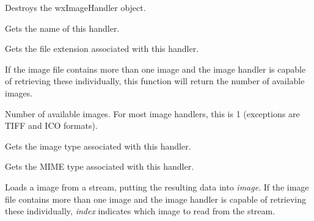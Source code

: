\label{wximagehandlerdtor}


Destroys the wxImageHandler object.


\label{wximagehandlergetname}


Gets the name of this handler.


\label{wximagehandlergetextension}


Gets the file extension associated with this handler.


\label{wximagehandlergetimagecount}


If the image file contains more than one image and the image handler is capable 
of retrieving these individually, this function will return the number of
available images.



Number of available images. For most image handlers, this is 1 (exceptions
are TIFF and ICO formats).


\label{wximagehandlergettype}


Gets the image type associated with this handler.


\label{wximagehandlergetmimetype}


Gets the MIME type associated with this handler.


\label{wximagehandlerloadfile}


Loads a image from a stream, putting the resulting data into {\it image}. If the image file contains
more than one image and the image handler is capable of retrieving these individually, {\it index}
indicates which image to read from the stream.

